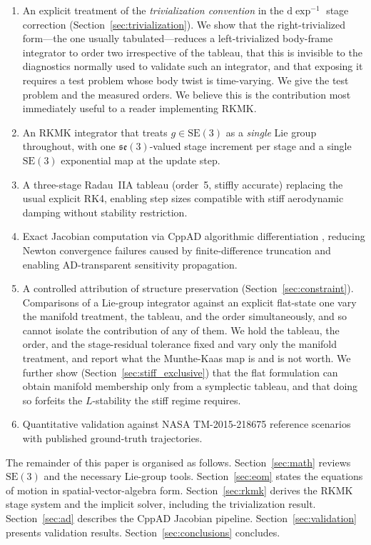 \documentclass[a4paper,10pt]{article}
\newcommand{\SE}{\mathrm{SE}(3)}
\newcommand{\se}{\mathfrak{se}(3)}
\newcommand{\dexp}{\mathrm{d}\exp}
\theoremstyle{definition}
\begin{document}
\begin{enumerate}[leftmargin=*, label=(\arabic*)]
  \item An explicit treatment of the \emph{trivialization convention} in the
    $\dexp^{-1}$ stage correction (Section~\ref{sec:trivialization}).  We show
    that the right-trivialized form---the one usually tabulated---reduces a
    left-trivialized body-frame integrator to order two irrespective of the
    tableau, that this is invisible to the diagnostics normally used to
    validate such an integrator, and that exposing it requires a test problem
    whose body twist is time-varying.  We give the test problem and the
    measured orders.  We believe this is the contribution most immediately
    useful to a reader implementing RKMK.
  \item An RKMK integrator that treats $g \in \SE$ as a \emph{single} Lie
    group throughout, with one $\se$-valued stage increment per stage and a
    single $\SE$ exponential map at the update step.
  \item A three-stage Radau~IIA tableau (order~5, stiffly accurate) replacing
    the usual explicit RK4, enabling step sizes compatible with stiff
    aerodynamic damping without stability restriction.
  \item Exact Jacobian computation via CppAD algorithmic differentiation
    \citep{cppad}, reducing Newton convergence failures caused by
    finite-difference truncation and enabling AD-transparent sensitivity
    propagation.
  \item A controlled attribution of structure preservation
    (Section~\ref{sec:constraint}).  Comparisons of a Lie-group integrator
    against an explicit flat-state one vary the manifold treatment, the
    tableau, and the order simultaneously, and so cannot isolate the
    contribution of any of them.  We hold the tableau, the order, and the
    stage-residual tolerance fixed and vary only the manifold treatment, and
    report what the Munthe-Kaas map is and is not worth.  We further show
    (Section~\ref{sec:stiff_exclusive}) that the flat formulation can obtain
    manifold membership only from a symplectic tableau, and that doing so
    forfeits the $L$-stability the stiff regime requires.
  \item Quantitative validation against NASA TM-2015-218675 reference
    scenarios with published ground-truth trajectories.
\end{enumerate}

The remainder of this paper is organised as follows.
Section~\ref{sec:math} reviews $\SE$ and the necessary Lie-group tools.
Section~\ref{sec:eom} states the equations of motion in spatial-vector-algebra
form.  Section~\ref{sec:rkmk} derives the RKMK stage system and the implicit
solver, including the trivialization result.
Section~\ref{sec:ad} describes the CppAD Jacobian pipeline.
Section~\ref{sec:validation} presents validation results.
Section~\ref{sec:conclusions} concludes.
\end{document}
